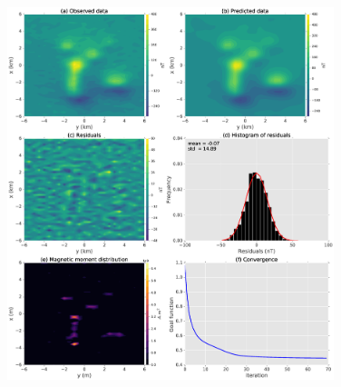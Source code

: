 
\begin{figure}
	\centering
	\includegraphics[width=0.85\textwidth]{Fig/unidir_test/results_compiled_LM_NNLS_magRM.eps}
	\caption{}
	\label{fig:unidir_test}
\end{figure}